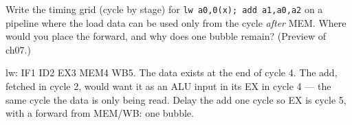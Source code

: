 \begin{exercise}[hard]\label{ex:h06d}
Write the timing grid (cycle by stage) for \texttt{lw a0,0(x);
add a1,a0,a2} on a pipeline where the load data can be used only from
the cycle \emph{after} MEM. Where would you place the forward, and why
does one bubble remain? (Preview of ch07.)
\end{exercise}
\begin{solution}[hint]
lw: IF1 ID2 EX3 MEM4 WB5. The data exists at the end of cycle 4. The
add, fetched in cycle 2, would want it as an ALU input in its EX in
cycle 4 --- the same cycle the data is only being read. Delay the add
one cycle so EX is cycle 5, with a forward from MEM/WB: one bubble.
\end{solution}

\emergencystretch=0pt
